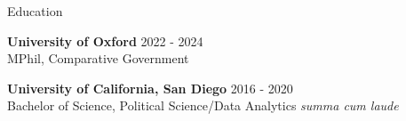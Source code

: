 \documentclass[10pt]{resume} %
\begin{document}
	
	
	\begin{rSection}{Education}
		
		{\bf University of Oxford} \hfill {2022 - 2024} 
		\\ MPhil, Comparative Government
		
		{\bf University of California, San Diego} \hfill {2016 - 2020} 
		\\ Bachelor of Science, Political Science/Data Analytics \hfill {\em summa cum laude}
		
	\end{rSection}
	
	
\end{document}
